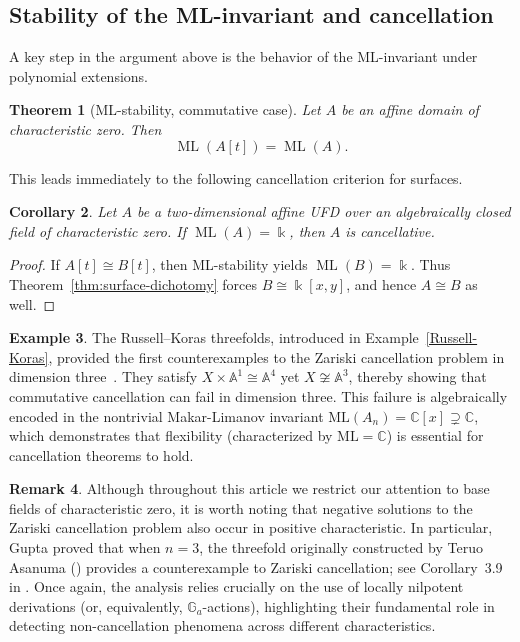 \documentclass{amsart}
\theoremstyle{plain}
\newtheorem{theorem}{Theorem}
\newtheorem{corollary}[theorem]{Corollary}
\numberwithin{theorem}{section}
\numberwithin{equation}{theorem}
\theoremstyle{definition}
\newtheorem{example}[theorem]{Example}
\newtheorem{remark}[theorem]{Remark}
\DeclareMathOperator{\ML}{ML}
\begin{document}
\subsection{Stability of the ML-invariant and cancellation}

A key step in the argument above is the behavior of the ML-invariant under
polynomial extensions.

\begin{theorem}[ML-stability, commutative case]
\label{thm:ML-stable-comm}
Let $A$ be an affine domain of characteristic zero.  
Then 
\[
    \ML(A[t])=\ML(A).
\]
\end{theorem}

This leads immediately to the following cancellation criterion for surfaces.

\begin{corollary}
\label{cor:surface-cancel}
Let $A$ be a two-dimensional affine UFD over an algebraically closed 
field of characteristic zero.  
If $\ML(A)=\Bbbk$, then $A$ is cancellative.
\end{corollary}

\begin{proof}
If $A[t]\cong B[t]$, then ML-stability yields $\ML(B)=\Bbbk$.  
Thus Theorem~\ref{thm:surface-dichotomy} forces $B\cong\Bbbk[x,y]$, and hence 
$A\cong B$ as well.
\end{proof}


\begin{example}
   The Russell–Koras threefolds, introduced in Example~\ref{Russell-Koras}, provided the first counterexamples to the Zariski cancellation problem in dimension three~\cite{ K96,Ru}. They satisfy $X \times \mathbb{A}^1 \cong \mathbb{A}^4$ yet $X \not\cong \mathbb{A}^3$, thereby showing that commutative cancellation can fail in dimension three. This failure is algebraically encoded in the nontrivial Makar-Limanov invariant $\mathrm{ML}(A_n) = \mathbb{C}[x] \supsetneq \mathbb{C}$, which demonstrates that flexibility (characterized by $\mathrm{ML} = \mathbb{C}$) is essential for cancellation theorems to hold.
\end{example}


    \begin{remark}
Although throughout this article we restrict our attention to base fields of characteristic zero, it is worth noting that negative solutions to the Zariski cancellation problem also occur in positive characteristic. In particular, Gupta proved that when $n=3$, the threefold originally constructed by Teruo Asanuma (\cite{As1,As2}) provides a counterexample to Zariski cancellation; see Corollary~3.9 in \cite{Gu1}. Once again, the analysis relies crucially on the use of locally nilpotent derivations (or, equivalently, $\mathbb{G}_a$-actions), highlighting their fundamental role in detecting non-cancellation phenomena across different characteristics.
\end{remark}
\end{document}
